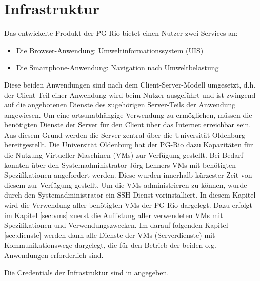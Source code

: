 \chapter{Infrastruktur}
Das entwickelte Produkt der PG-Rio bietet einen Nutzer zwei Services an:
\begin{itemize}
	\item Die Browser-Anwendung: Umweltinformationssystem (UIS)
	\item Die Smartphone-Anwendung: Navigation nach Umweltbelastung
\end{itemize} 
Diese beiden Anwendungen sind nach dem Client-Server-Modell umgesetzt, d.h. der Client-Teil einer Anwendung wird beim Nutzer ausgeführt und ist zwingend auf die angebotenen Dienste des zugehörigen Server-Teils der Anwendung angewiesen.
Um eine ortsunabhängige Verwendung zu ermöglichen, müssen die benötigten Dienste der Server für den Client über das Internet erreichbar sein.
Aus diesem Grund werden die Server zentral über die Universität Oldenburg bereitgestellt.
Die Universität Oldenburg hat der PG-Rio dazu Kapazitäten für die Nutzung Virtueller Maschinen (VMs) zur Verfügung gestellt.
Bei Bedarf konnten über den Systemadministrator Jörg Lehners VMs mit benötigten Spezifikationen angefordert werden.
Diese wurden innerhalb kürzester Zeit von diesem zur Verfügung gestellt.
Um die VMs administrieren zu können, wurde durch den Systemadministrator ein SSH-Dienst vorinstalliert.
In diesem Kapitel wird die Verwendung aller benötigten VMs der PG-Rio dargelegt.
Dazu erfolgt im Kapitel \ref{sec:vms} zuerst die Auflistung aller verwendeten VMs mit Spezifikationen und Verwendungszwecken.
Im darauf folgenden Kapitel \ref{sec:dienste} werden dann alle Dienste der VMs (Serverdienste) mit Kommunikationswege dargelegt, die für den Betrieb der beiden o.g. Anwendungen erforderlich sind.

\begin{mdframed}[frametitle=Hinweis]
	\begin{minipage}{\linewidth}
		Die Credentials der Infrastruktur sind in  angegeben.
	\end{minipage}
\end{mdframed}

